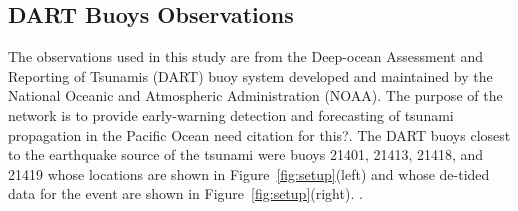 \subsection{DART Buoys Observations}

The observations used in this study are from the Deep-ocean Assessment and Reporting of Tsunamis (DART) buoy system developed and maintained by the National Oceanic and Atmospheric Administration (NOAA).  The purpose of the network is to provide early-warning detection and forecasting of tsunami propagation in the Pacific Ocean \alert{need citation for this?}.  The DART buoys closest to the earthquake source of the \tohoku tsunami were buoys 21401, 21413, 21418, and 21419 whose locations are shown in Figure~\ref{fig:setup}(left) and whose de-tided data for the event are shown in Figure~\ref{fig:setup}(right). .
